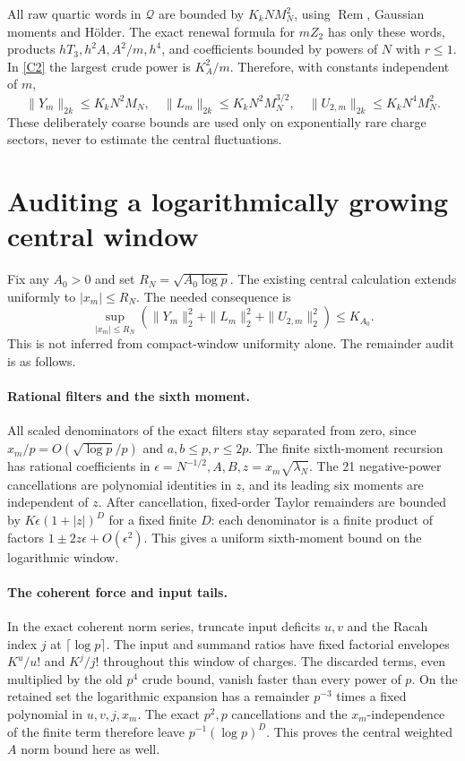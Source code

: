 \documentclass[11pt,a4paper]{article}
\newcommand{\Rem}{\operatorname{Rem}}
\begin{document}
All raw quartic words in $\mathcal Q$ are bounded by
$K_kNM_N^2$, using $\Rem$, Gaussian moments and H\"older.
The exact renewal formula for $mZ_2$ has only these words,
products $hT_3,h^2A,A^2/m,h^4$, and coefficients bounded by
powers of $N$ with $r\le1$. In \eqref{C2} the largest crude
power is $K_A^2/m$. Therefore, with constants independent of $m$,
\begin{equation}
 \|Y_m\|_{2k}\le K_kN^2M_N,\quad
 \|L_m\|_{2k}\le K_kN^2M_N^{3/2},\quad
 \|U_{2,m}\|_{2k}\le K_kN^4M_N^2.\label{coarse}
\end{equation}
These deliberately coarse bounds are used only on exponentially
rare charge sectors, never to estimate the central fluctuations.

\newpage
\section{Auditing a logarithmically growing central window}
Fix any $A_0>0$ and set $R_N=\sqrt{A_0\log p}$.
The existing central calculation extends uniformly to
$|x_m|\le R_N$. The needed consequence is
\begin{equation}
 \sup_{|x_m|\le R_N}
 (\|Y_m\|_2^2+\|L_m\|_2^2+\|U_{2,m}\|_2^2)\le K_{A_0}.
 \label{innerbound}
\end{equation}
This is not inferred from compact-window uniformity alone.
The remainder audit is as follows.

\paragraph{Rational filters and the sixth moment.}
All scaled denominators of the exact filters stay separated from
zero, since $x_m/p=O(\sqrt{\log p}/p)$ and $a,b\le p,r\le2p$.
The finite sixth-moment recursion has rational coefficients in
$\epsilon=N^{-1/2},A,B,z=x_m\sqrt{\lambda_N}$.
The 21 negative-power cancellations are polynomial identities
in $z$, and its leading six moments are independent of $z$.
After cancellation, fixed-order Taylor remainders are bounded by
$K\epsilon(1+|z|)^D$ for a fixed finite $D$: each denominator
is a finite product of factors $1\pm2z\epsilon+O(\epsilon^2)$.
This gives a uniform sixth-moment bound on the logarithmic window.

\paragraph{The coherent force and input tails.}
In the exact coherent norm series, truncate input deficits
$u,v$ and the Racah index $j$ at $\lceil\log p\rceil$.
The input and summand ratios have fixed factorial envelopes
$K^u/u!$ and $K^j/j!$ throughout this window of charges.
The discarded terms, even multiplied by the old $p^4$ crude bound,
vanish faster than every power of $p$.
On the retained set the logarithmic expansion has a remainder
$p^{-3}$ times a fixed polynomial in $u,v,j,x_m$.
The exact $p^2,p$ cancellations and the $x_m$-independence of
the finite term therefore leave $p^{-1}(\log p)^D$.
This proves the central weighted $A$ norm bound here as well.
\end{document}
